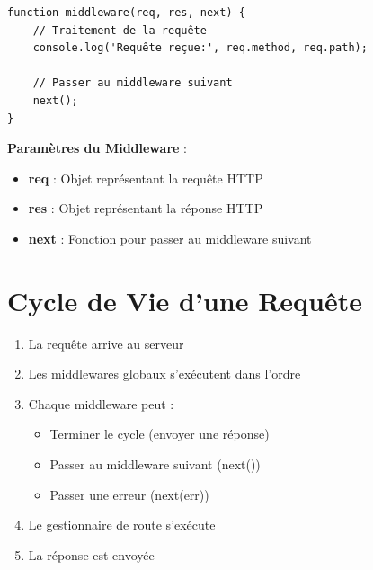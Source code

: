 \begin{lstlisting}[style=javascript, caption=Signature d'un middleware]
function middleware(req, res, next) {
    // Traitement de la requête
    console.log('Requête reçue:', req.method, req.path);
    
    // Passer au middleware suivant
    next();
}
\end{lstlisting}

\begin{definitionbox}
    \textbf{Paramètres du Middleware} :
    \begin{itemize}
        \item \textbf{req} : Objet représentant la requête HTTP
        \item \textbf{res} : Objet représentant la réponse HTTP
        \item \textbf{next} : Fonction pour passer au middleware suivant
    \end{itemize}
\end{definitionbox}

\section{Cycle de Vie d'une Requête}

\begin{enumerate}
    \item La requête arrive au serveur
    \item Les middlewares globaux s'exécutent dans l'ordre
    \item Chaque middleware peut :
        \begin{itemize}
            \item Terminer le cycle (envoyer une réponse)
            \item Passer au middleware suivant (next())
            \item Passer une erreur (next(err))
        \end{itemize}
    \item Le gestionnaire de route s'exécute
    \item La réponse est envoyée
\end{enumerate}

\begin{center}
\end{center}

